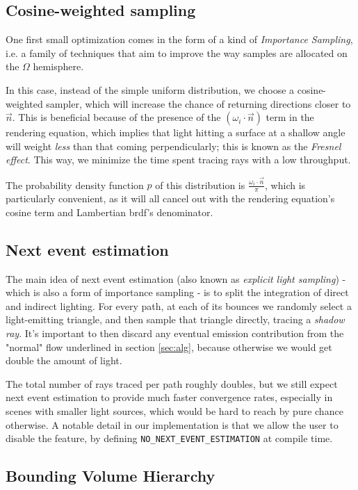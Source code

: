\documentclass[12pt,a4paper]{article}
\begin{document}
\subsection{Cosine-weighted sampling}

One first small optimization comes in the form of a kind of \textit{Importance Sampling}, i.e. a family of techniques that aim to improve the way samples are allocated on the $\Omega$ hemisphere.

In this case, instead of the simple uniform distribution, we choose a cosine-weighted sampler, which will increase the chance of returning directions closer to $\Vec{n}$. This is beneficial because of the presence of the $(\omega_i \cdot \vec{n})$ term in the rendering equation, which implies that light hitting a surface at a shallow angle will weight \textit{less} than that coming perpendicularly; this is known as the \textit{Fresnel effect}. This way, we minimize the time spent tracing rays with a low throughput.

The probability density function $p$ of this distribution is $\frac{\omega_i \cdot \vec{n}}{\pi}$, which is particularly convenient, as it will all cancel out with the rendering equation's cosine term and Lambertian brdf's denominator.

\subsection{Next event estimation}

The main idea of next event estimation (also known as \textit{explicit light sampling}) - which is also a form of importance sampling - is to split the integration of direct and indirect lighting. For every path, at each of its bounces we randomly select a light-emitting triangle, and then sample that triangle directly, tracing a \textit{shadow ray}. It's important to then discard any eventual emission contribution from the "normal" flow underlined in section \ref{sec:alg}, because otherwise we would get double the amount of light.

The total number of rays traced per path roughly doubles, but we still expect next event estimation to provide much faster convergence rates, especially in scenes with smaller light sources, which would be hard to reach by pure chance otherwise. A notable detail in our implementation is that we allow the user to disable the feature, by defining \verb|NO_NEXT_EVENT_ESTIMATION| at compile time.

\subsection{Bounding Volume Hierarchy}
\label{sec:bvh}
\end{document}
